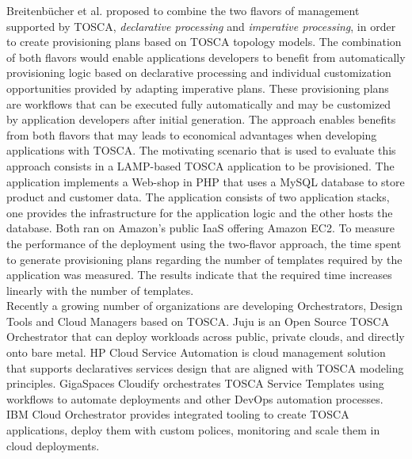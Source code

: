 Breitenb\"{u}cher et al. \cite{breitenbucher2014combining} proposed to combine the two flavors of management
supported by TOSCA, \textit{declarative processing} and \textit{imperative processing}, in order to create
provisioning plans based on TOSCA topology models. The combination of both flavors would enable applications
developers to benefit from automatically provisioning logic based on declarative processing and individual
customization opportunities provided by adapting imperative plans. These provisioning plans are workflows that
can be executed fully automatically and may be customized by application developers after initial generation.
The approach enables benefits from both flavors that may leads to economical advantages when developing applications
with TOSCA. The motivating scenario that is used to evaluate this approach consists in a LAMP-based TOSCA
application to be provisioned. The application implements a Web-shop in PHP that uses a MySQL database to store
product and customer data. The application consists of two application stacks, one provides the infrastructure
for the application logic and the other hosts the database. Both ran on Amazon's public IaaS offering
Amazon EC2. To measure the performance of the deployment using the two-flavor approach, the time spent to
generate provisioning plans regarding the number of templates required by the application was measured.
The results indicate that the required time increases linearly with the number of templates.\\

Recently a growing number of organizations are developing Orchestrators, Design Tools and Cloud Managers
based on TOSCA. Juju is an Open Source TOSCA Orchestrator that can deploy workloads across public, private clouds,
and directly onto bare metal. HP Cloud Service Automation is cloud management solution that supports declaratives
services design that are aligned with TOSCA modeling principles. GigaSpaces Cloudify orchestrates TOSCA Service
Templates using workflows to automate deployments and other DevOps automation processes. IBM Cloud Orchestrator
provides integrated tooling to create TOSCA applications, deploy them with custom polices, monitoring and scale
them in cloud deployments.\\

